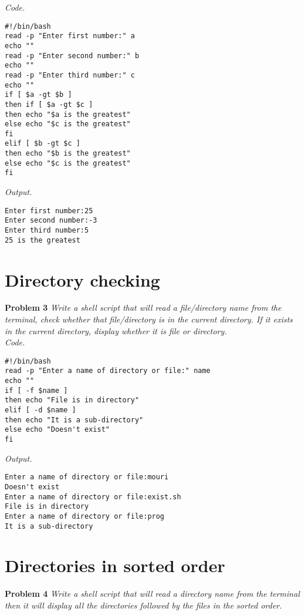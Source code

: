 \documentclass[12pt]{article}
\begin{document}
\textit{Code.}

\begin{lstlisting}
#!/bin/bash
read -p "Enter first number:" a
echo ""
read -p "Enter second number:" b
echo ""
read -p "Enter third number:" c
echo ""
if [ $a -gt $b ]
then if [ $a -gt $c ]
then echo "$a is the greatest"
else echo "$c is the greatest"
fi
elif [ $b -gt $c ]
then echo "$b is the greatest"
else echo "$c is the greatest"
fi
\end{lstlisting}

\textit{Output.}
\begin{lstlisting}
Enter first number:25
Enter second number:-3
Enter third number:5
25 is the greatest
\end{lstlisting}

\section{Directory checking}

\textbf{Problem 3} \textit{Write a shell script that will read a file/directory name from the terminal, check whether that
	file/directory is in the current directory. If it exists in the current directory, display whether it is file or
	directory.}\\

\textit{Code.}

\begin{lstlisting}
#!/bin/bash
read -p "Enter a name of directory or file:" name
echo ""
if [ -f $name ]
then echo "File is in directory"
elif [ -d $name ]
then echo "It is a sub-directory"
else echo "Doesn't exist"
fi
\end{lstlisting}

\textit{Output.}
\begin{lstlisting}
Enter a name of directory or file:mouri
Doesn't exist
Enter a name of directory or file:exist.sh
File is in directory
Enter a name of directory or file:prog
It is a sub-directory
\end{lstlisting}

\section{Directories in sorted order}

\textbf{Problem 4} \textit{Write a shell script that will read a directory name from the terminal then it will display all the
	directories followed by the files in the sorted order.}\\
\end{document}
